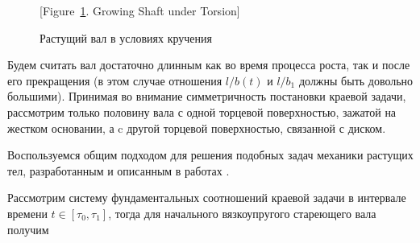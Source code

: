 \begin{figure}[!b]

\footnotesize 



\caption{Растущий вал в условиях кручения \label{Manzh_Fig_1}}



[Figure~\ref{Manzh_Fig_1}. Growing Shaft under Torsion]



\end{figure}



Будем считать вал достаточно длинным как во время процесса роста, так и после его прекращения (в этом случае отношения $l/b(t)$ и $l/b_1$ должны быть довольно большими). Принимая во внимание симметричность постановки краевой задачи, рассмотрим только половину вала с одной торцевой поверхностью, зажатой на жестком основании, а c другой торцевой поверхностью, связанной с диском.



Воспользуемся общим подходом для решения подобных задач механики растущих тел, разработанным и описанным в работах \cite{Manzh_bib_01,Manzh_bib_02,Manzh_bib_03,Manzh_bib_022,Manzh_bib_033,Manzh_bib_04,Manzh_bib_05,Manzh_bib_06,Manzh_bib_07,Manzh_bib_08}.



Рассмотрим систему фундаментальных соотношений краевой задачи в интервале времени $t\in[\tau_0,\tau_1]$, тогда для начального вязкоупругого стареющего вала получим

